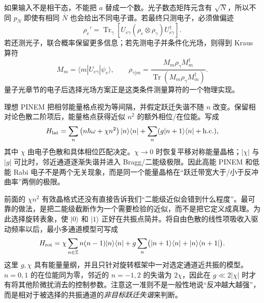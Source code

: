 如果输入不是相干态，不能把 $a$ 替成一个数。光子数态矩阵元含有 $\sqrt N$，所以不同 $p_N$ 即使有相同 $\bar N$ 也会给出不同电子谱。若最终只测电子，必须做偏迹
\begin{equation}
\rho_e'=\operatorname{Tr}_\gamma\!
\left[U_{e\gamma}(\rho_e\otimes\rho_\gamma)U_{e\gamma}^\dagger\right].
\label{eq:ch08-trace}
\end{equation}
若还测光子，联合概率保留更多信息；若先测电子并条件化光场，则得到 Kraus 算符
\begin{equation}
M_m=\langle m|U_{e\gamma}|\psi_e\rangle,
\qquad
\rho_{\gamma|m}=\frac{M_m\rho_\gamma M_m^\dagger}{\operatorname{Tr}(M_m\rho_\gamma M_m^\dagger)}.
\label{eq:ch08-kraus}
\end{equation}
量子光章节的电子后选择光场方案正是这类条件测量算符的一个物理实现。

理想 PINEM 把相邻能量格点视为等间隔，并假定跃迁失谐不随 $n$ 改变。保留相对论色散二阶项后，能量格点获得近似 $n^2$ 的额外相位/在位能。写成
\begin{equation}
H_{\rm lat}=\sum_n\left(n\hbar\omega+\chi n^2\right)|n\rangle\langle n|
+\sum_n(g|n+1\rangle\langle n|+\mathrm{h.c.}),
\label{eq:ch08-recoil-lattice}
\end{equation}
其中 $\chi$ 由电子色散和具体相位匹配决定。$\chi\to0$ 时恢复平移对称能量晶格；$|\chi|$ 与 $|g|$ 可比时，邻近通道逐渐失谐并进入 Bragg/二能级极限。因此高能 PINEM 和低能 Rabi 电子不是两个无关现象，而是同一个能量晶格在“跃迁带宽大于/小于反冲曲率”两侧的极限。


前面的 $\chi n^2$ 有效晶格式还没有直接告诉我们“二能级近似会错到什么程度”。最可靠的做法，是把二能级截断作为一个需要检验的近似，而不是把它定义成真理。为此选择旋转表象，使 $|0\rangle$ 和 $|1\rangle$ 正好在共振点简并。将自由色散的线性项吸收入驱动频率以后，最小多通道模型可写成
\begin{equation}
H_{\rm rot}=\chi\sum_{n\in\mathbb Z}n(n-1)|n\rangle\langle n|
+g\sum_n\bigl(|n+1\rangle\langle n|+|n\rangle\langle n+1|\bigr).
\label{eq:ch08-rotating-recoil}
\end{equation}
这里 $g,\chi$ 具有能量量纲，并且只针对旋转框架中一对选定通道近共振的模型。$n=0,1$ 的在位能同为零，邻近的 $n=-1,2$ 的失谐为 $2\chi$，因此在 $g\ll2|\chi|$ 时才有将其他阶微扰消去的控制参数。注意这一准则不是一般性地说“反冲越大越强”，而是相对于被选择的共振通道的\emph{非目标跃迁失谐}来判断。


